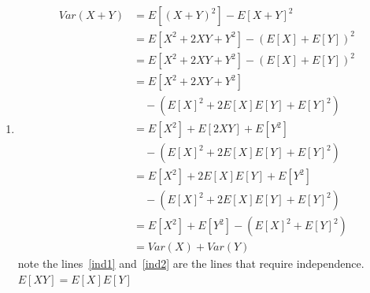 \documentclass{article}
\begin{document}
\begin{enumerate}
\begin{enumerate}
        \item
        \begin{align}
        Var(X+Y) &= E[(X+Y)^2] - E[X+Y]^2\\
        &= E[X^2+2XY+Y^2] - (E[X]+E[Y])^2\\
        &= E[X^2+2XY+Y^2] - (E[X]+E[Y])^2\\
        &= E[X^2+2XY+Y^2] \\
        &\quad - (E[X]^2 + 2E[X]E[Y] + E[Y]^2)\nonumber\\
        &= E[X^2]+E[2XY]+E[Y^2]\label{ind1} \\
        &\quad - (E[X]^2 + 2E[X]E[Y] + E[Y]^2)\nonumber\\
        &= E[X^2]+2E[X]E[Y]+E[Y^2] \label{ind2}\\
        &\quad - (E[X]^2 + 2E[X]E[Y] + E[Y]^2)\nonumber\\
        &= E[X^2]+E[Y^2] - (E[X]^2  + E[Y]^2)\\ 
        &= Var(X)+Var(Y)
        \end{align}
        note the lines~\ref{ind1} and~\ref{ind2} are the lines that require independence. \(E[XY]=E[X]E[Y]\)


        \end{enumerate}
        
\end{enumerate}
\end{document}
